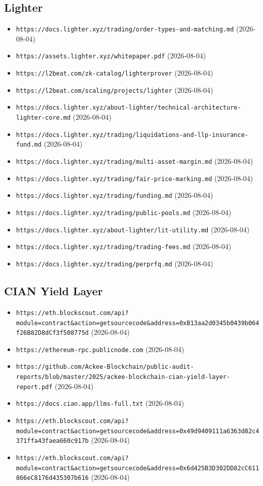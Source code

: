 \subsection*{Lighter}
\begin{itemize}\setlength{\itemsep}{0pt}\small
\item \texttt{https://docs.lighter.xyz/trading/order-types-and-matching.md} (2026-08-04)
\item \texttt{https://assets.lighter.xyz/whitepaper.pdf} (2026-08-04)
\item \texttt{https://l2beat.com/zk-catalog/lighterprover} (2026-08-04)
\item \texttt{https://l2beat.com/scaling/projects/lighter} (2026-08-04)
\item \texttt{https://docs.lighter.xyz/about-lighter/technical-architecture-lighter-core.md} (2026-08-04)
\item \texttt{https://docs.lighter.xyz/trading/liquidations-and-llp-insurance-fund.md} (2026-08-04)
\item \texttt{https://docs.lighter.xyz/trading/multi-asset-margin.md} (2026-08-04)
\item \texttt{https://docs.lighter.xyz/trading/fair-price-marking.md} (2026-08-04)
\item \texttt{https://docs.lighter.xyz/trading/funding.md} (2026-08-04)
\item \texttt{https://docs.lighter.xyz/trading/public-pools.md} (2026-08-04)
\item \texttt{https://docs.lighter.xyz/about-lighter/lit-utility.md} (2026-08-04)
\item \texttt{https://docs.lighter.xyz/trading/trading-fees.md} (2026-08-04)
\item \texttt{https://docs.lighter.xyz/trading/perprfq.md} (2026-08-04)
\end{itemize}

\subsection*{CIAN Yield Layer}
\begin{itemize}\setlength{\itemsep}{0pt}\small
\item \texttt{https://eth.blockscout.com/api?module=contract\&action=getsourcecode\&address=0xB13aa2d0345b0439b064f26B82D8dCf3f508775d} (2026-08-04)
\item \texttt{https://ethereum-rpc.publicnode.com} (2026-08-04)
\item \texttt{https://github.com/Ackee-Blockchain/public-audit-reports/blob/master/2025/ackee-blockchain-cian-yield-layer-report.pdf} (2026-08-04)
\item \texttt{https://docs.cian.app/llms-full.txt} (2026-08-04)
\item \texttt{https://eth.blockscout.com/api?module=contract\&action=getsourcecode\&address=0x49d9409111a6363d82c4371ffa43faea660c917b} (2026-08-04)
\item \texttt{https://eth.blockscout.com/api?module=contract\&action=getsourcecode\&address=0x6d425B3D302DD82cC611866eC8176d435307b616} (2026-08-04)
\end{itemize}

